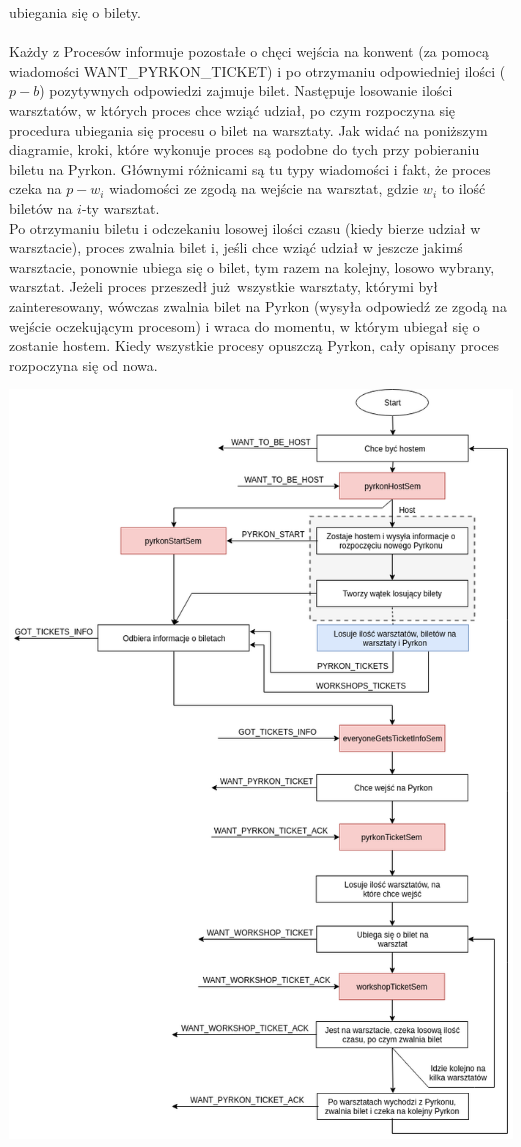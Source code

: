 \documentclass[10pt,a4paper]{article}
\begin{document}
ubiegania się o bilety.\\
\\
Każdy z Procesów informuje pozostałe o chęci wejścia na konwent (za pomocą wiadomości WANT\_PYRKON\_TICKET)
i po otrzymaniu odpowiedniej ilości ($p-b$) pozytywnych odpowiedzi zajmuje bilet. Następuje losowanie
ilości warsztatów, w których proces chce wziąć udział, po czym rozpoczyna się procedura ubiegania
się procesu o bilet na warsztaty. Jak widać na poniższym diagramie, kroki, które wykonuje proces są 
podobne do tych przy pobieraniu biletu na Pyrkon. Głównymi różnicami są tu typy wiadomości i fakt, że 
proces czeka na $p-w_i$ wiadomości ze zgodą na wejście na warsztat, gdzie $w_i$ to ilość biletów na $i$-ty warsztat.\\
Po otrzymaniu biletu i odczekaniu losowej ilości czasu (kiedy bierze udział w warsztacie), proces 
zwalnia bilet i, jeśli chce wziąć udział w jeszcze jakimś warsztacie, ponownie ubiega się o bilet,
tym razem na kolejny, losowo wybrany, warsztat. Jeżeli proces przeszedł już wszystkie warsztaty, którymi był
zainteresowany, wówczas zwalnia bilet na Pyrkon (wysyła odpowiedź ze zgodą na wejście oczekującym procesom)
i wraca do momentu, w którym ubiegał się o zostanie hostem. Kiedy wszystkie procesy opuszczą Pyrkon,
cały opisany proces rozpoczyna się od nowa.


\newpage
\includegraphics[height=\textheight]{diagram.png}
\newpage
\end{document}
